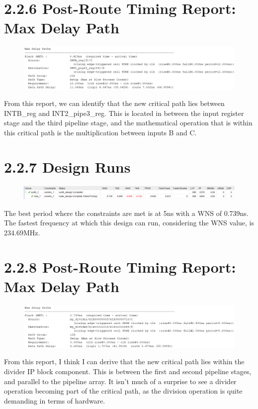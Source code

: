\documentclass[11pt]{report}
\begin{document}
\section*{2.2.6 Post-Route Timing Report: Max Delay Path}
\begin{figure}[H]
    \includegraphics[width=\columnwidth]{Reports/Lab3/Assets/2.2.6_max-delay-path.png}
\end{figure}
From this report, we can identify that the new critical path lies between INTB\_reg and INT2\_pipe3\_reg. This is located in between the input register stage and the third pipeline stage, and the mathematical operation that is within this critical path is the multiplication between inputs B and C.

\section*{2.2.7 Design Runs}
\begin{figure}[H]
    \includegraphics[width=\columnwidth]{Reports/Lab3/Assets/2.2.7_design-runs.png}
\end{figure}
The best period where the constraints are met is at 5ns with a WNS of 0.739ns. The fastest frequency at which this design can run, considering the WNS value, is 234.69MHz.


\section*{2.2.8 Post-Route Timing Report: Max Delay Path}
\begin{figure}[H]
    \includegraphics[width=\columnwidth]{Reports/Lab3/Assets/2.2.8_max-delay-path.png}
\end{figure}
From this report, I think I can derive that the new critical path lies within the divider IP block component. This is between the first and second pipeline stages, and parallel to the pipeline array. It isn't much of a surprise to see a divider operation becoming part of the critical path, as the division operation is quite demanding in terms of hardware.
\end{document}
